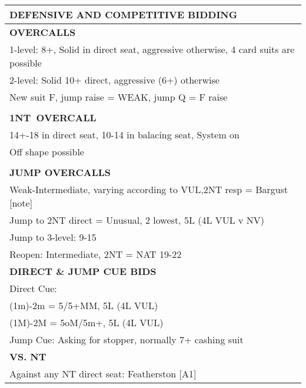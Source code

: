 \documentclass{article}
\newcommand\N{{\footnotesize NT}}
\begin{document}
\noindent
\small{
\begin{minipage}{90mm}
	\begin{tabular}{| p{88mm} |}
		\hline
		\cellcolor{green!25} \textbf{DEFENSIVE AND COMPETITIVE BIDDING} \\ \hline
		\cellcolor{orange!25}\textbf{OVERCALLS} \\ \hline
		1-level: 8+, Solid in direct seat, aggressive otherwise,
		4 card suits are possible\\ \hline
		2-level: Solid 10+ direct, aggressive (6+) otherwise\\ \hline
		New suit F, jump raise = WEAK, jump Q = F raise\\ \hline
		\\ \hline
		\cellcolor{orange!25}\textbf{1\N \ OVERCALL} \\ \hline
		14+-18 in direct seat, 10-14 in balacing seat,
		System on\\ \hline
		Off shape possible\\ \hline
		\\ \hline
		\cellcolor{orange!25}\textbf{JUMP OVERCALLS} \\ \hline
		Weak-Intermediate, varying according to VUL,2{\N} resp = Bargust [note]\\ \hline
		Jump to 2{\N} direct = Unusual, 2 lowest, 5L (4L VUL v NV)\\ \hline
		Jump to 3-level: 9-15\\ \hline
		Reopen: Intermediate, 2{\N} = NAT 19-22\\ \hline
		\cellcolor{orange!25}\textbf{DIRECT \& JUMP CUE BIDS} \\ \hline
		Direct Cue:\\ \hline
		(1m)-2m = 5/5+MM, 5L (4L VUL)\\ \hline
		(1M)-2M = 5oM/5m+, 5L (4L VUL)\\ \hline
		Jump Cue: Asking for stopper, normally 7+ cashing suit\\ \hline
		\cellcolor{orange!25}\textbf{VS. NT} \\ \hline
		Against any NT direct seat: Featherston [A1]\\ \hline

\end{tabular}
\end{minipage}}
\end{document}
